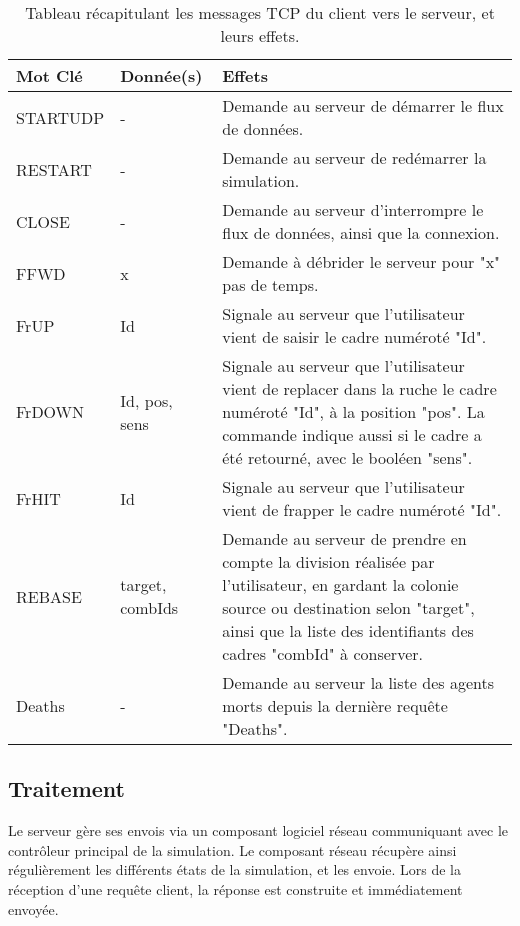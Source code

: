 	
	\begin{table}
		\begin{tabularx}{\textwidth}{|l|l|X|}
		\hline
		\textbf{Mot Clé }& \textbf{Donnée(s)} & \textbf{Effets}\\
		\hline
		STARTUDP & - & Demande au serveur de démarrer le flux de données.\\
		\hline
		RESTART & - & Demande au serveur de redémarrer la simulation.\\
		\hline
		CLOSE & - & Demande au serveur d'interrompre le flux de données, ainsi que la connexion.\\
		\hline
		FFWD & x & Demande à débrider le serveur pour "x" pas de temps.\\
		\hline
		FrUP & Id & Signale au serveur que l'utilisateur vient de saisir le cadre numéroté "Id".\\
		\hline
		FrDOWN & Id, pos, sens & Signale au serveur que l'utilisateur vient de replacer dans la ruche le cadre numéroté "Id", à la position "pos". La commande indique aussi si le cadre a été retourné, avec le booléen "sens".\\
		\hline
		FrHIT & Id & Signale au serveur que l'utilisateur vient de frapper le cadre numéroté "Id".\\
		\hline
		REBASE & target, {combIds} & Demande au serveur de prendre en compte la division réalisée par l'utilisateur, en gardant la colonie source ou destination selon "target", ainsi que la liste des identifiants des cadres "combId" à conserver.\\
		\hline
		Deaths & - & Demande au serveur la liste des agents morts depuis la dernière requête "Deaths".\\
		\hline
		\end{tabularx}
	\caption{Tableau récapitulant les messages TCP du client vers le serveur, et leurs effets.}
	\label{tabClientServ}
	\end{table}
	
	\subsection{Traitement}
	Le serveur gère ses envois via un composant logiciel réseau communiquant avec le contrôleur principal de la simulation. Le composant réseau récupère ainsi régulièrement les différents états de la simulation, et les envoie. Lors de la réception d'une requête client, la réponse est construite et immédiatement envoyée.
	
